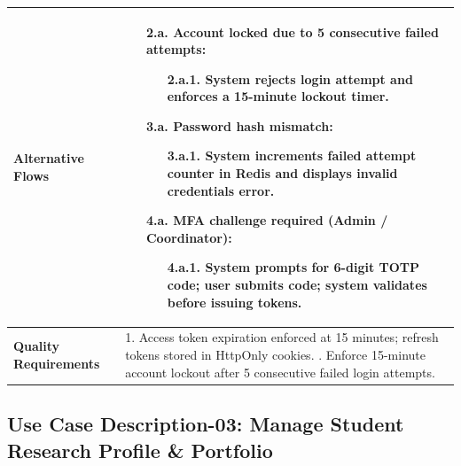 \begin{table}[H]
\begin{tabularx}{\textwidth}{|l|X|}
\textbf{Alternative Flows} &
\begin{itemize}[leftmargin=*]
    \item[\textbf{2.a.}] \textbf{Account locked due to 5 consecutive failed attempts:}
    \begin{itemize}[leftmargin=*]
        \item[2.a.1.] System rejects login attempt and enforces a 15-minute lockout timer.
    \end{itemize}
    \item[\textbf{3.a.}] \textbf{Password hash mismatch:}
    \begin{itemize}[leftmargin=*]
        \item[3.a.1.] System increments failed attempt counter in Redis and displays invalid credentials error.
    \end{itemize}
    \item[\textbf{4.a.}] \textbf{MFA challenge required (Admin / Coordinator):}
    \begin{itemize}[leftmargin=*]
        \item[4.a.1.] System prompts for 6-digit TOTP code; user submits code; system validates before issuing tokens.
    \end{itemize}
\end{itemize} \\ \hline
\textbf{Quality Requirements} & 
1. Access token expiration enforced at 15 minutes; refresh tokens stored in HttpOnly cookies. \newline
2. Enforce 15-minute account lockout after 5 consecutive failed login attempts. \\ \hline
\end{tabularx}
\end{table}

\clearpage
\subsection{Use Case Description-03: Manage Student Research Profile \& Portfolio}
\label{subsec:uc03}

